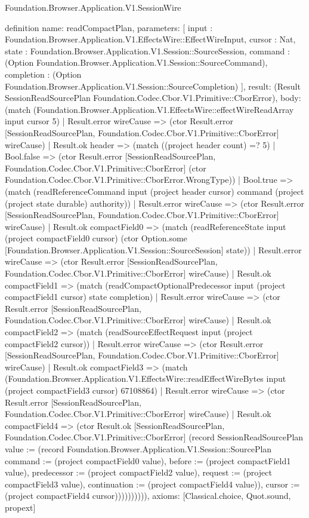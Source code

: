 \begin{lexlean}{Foundation.Browser.Application.V1.SessionWire}
\begin{semanticmodule}
definition{
  name: readCompactPlan,
  parameters: [
    input : Foundation.Browser.Application.V1.EffectsWire::EffectWireInput,
    cursor : Nat,
    state : Foundation.Browser.Application.V1.Session::SourceSession,
    command : (Option Foundation.Browser.Application.V1.Session::SourceCommand),
    completion : (Option Foundation.Browser.Application.V1.Session::SourceCompletion)
  ],
  result: (Result SessionReadSourcePlan Foundation.Codec.Cbor.V1.Primitive::CborError),
  body: (match (Foundation.Browser.Application.V1.EffectsWire::effectWireReadArray input cursor 5)
    | Result.error wireCause => (ctor Result.error [SessionReadSourcePlan, Foundation.Codec.Cbor.V1.Primitive::CborError] wireCause)
    | Result.ok header => (match ((project header count) =? 5)
      | Bool.false => (ctor Result.error [SessionReadSourcePlan, Foundation.Codec.Cbor.V1.Primitive::CborError] (ctor Foundation.Codec.Cbor.V1.Primitive::CborError.WrongType))
      | Bool.true => (match (readReferenceCommand input (project header cursor) command (project (project state durable) authority))
        | Result.error wireCause => (ctor Result.error [SessionReadSourcePlan, Foundation.Codec.Cbor.V1.Primitive::CborError] wireCause)
        | Result.ok compactField0 => (match (readReferenceState input (project compactField0 cursor) (ctor Option.some [Foundation.Browser.Application.V1.Session::SourceSession] state))
          | Result.error wireCause => (ctor Result.error [SessionReadSourcePlan, Foundation.Codec.Cbor.V1.Primitive::CborError] wireCause)
          | Result.ok compactField1 => (match (readCompactOptionalPredecessor input (project compactField1 cursor) state completion)
            | Result.error wireCause => (ctor Result.error [SessionReadSourcePlan, Foundation.Codec.Cbor.V1.Primitive::CborError] wireCause)
            | Result.ok compactField2 => (match (readSourceEffectRequest input (project compactField2 cursor))
              | Result.error wireCause => (ctor Result.error [SessionReadSourcePlan, Foundation.Codec.Cbor.V1.Primitive::CborError] wireCause)
              | Result.ok compactField3 => (match (Foundation.Browser.Application.V1.EffectsWire::readEffectWireBytes input (project compactField3 cursor) 67108864)
                | Result.error wireCause => (ctor Result.error [SessionReadSourcePlan, Foundation.Codec.Cbor.V1.Primitive::CborError] wireCause)
                | Result.ok compactField4 => (ctor Result.ok [SessionReadSourcePlan, Foundation.Codec.Cbor.V1.Primitive::CborError] (record SessionReadSourcePlan {value := (record Foundation.Browser.Application.V1.Session::SourcePlan {command := (project compactField0 value), before := (project compactField1 value), predecessor := (project compactField2 value), request := (project compactField3 value), continuation := (project compactField4 value)}), cursor := (project compactField4 cursor)}))))))))),
  axioms: [Classical.choice, Quot.sound, propext]
}


\end{semanticmodule}
\end{lexlean}
